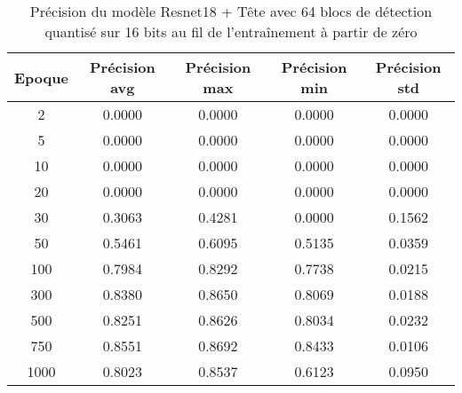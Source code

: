 \begin{table}[!ht]
    \caption{Précision du modèle Resnet18 + Tête avec 64 blocs de détection quantisé sur 16 bits au fil de l'entraînement à partir de zéro}
    \label{tab:qresnet18+head_64n_precision_16b_from_scratch}
    \centering
    \begin{tabular}{ |c||c|c|c|c|  }
        \hline
        \rowcolor{gray!50}
        Epoque & Précision avg & Précision max & Précision min & Précision std\\
        \hline
        2 & 0.0000 & 0.0000 & 0.0000 & 0.0000\\
        5 & 0.0000 & 0.0000 & 0.0000 & 0.0000\\
        10 & 0.0000 & 0.0000 & 0.0000 & 0.0000\\
        20 & 0.0000 & 0.0000 & 0.0000 & 0.0000\\
        30 & 0.3063 & 0.4281 & 0.0000 & 0.1562\\
        50 & 0.5461 & 0.6095 & 0.5135 & 0.0359\\
        100 & 0.7984 & 0.8292 & 0.7738 & 0.0215\\
        300 & 0.8380 & 0.8650 & 0.8069 & 0.0188\\
        500 & 0.8251 & 0.8626 & 0.8034 & 0.0232\\
        750 & 0.8551 & 0.8692 & 0.8433 & 0.0106\\
        1000 & 0.8023 & 0.8537 & 0.6123 & 0.0950\\
        \hline
    \end{tabular}
\end{table}

